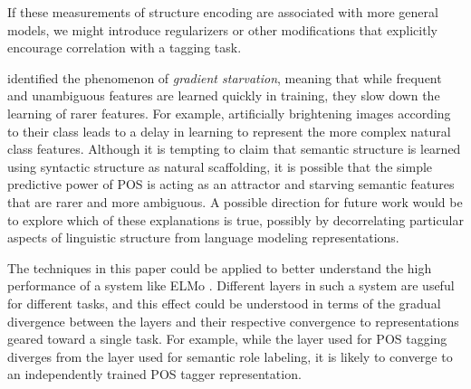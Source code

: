 If these measurements of structure encoding are associated with more general models, we might introduce regularizers or other modifications that explicitly encourage correlation with a tagging task.


\citet{combes_learning_2019} identified the phenomenon of \emph{gradient starvation}, meaning that while frequent and unambiguous features are learned quickly in training, they slow down the learning of rarer features. For example, artificially brightening images according to their class leads to a delay in learning to represent the more complex natural class features. Although it is tempting to claim that semantic structure is learned using  syntactic structure as natural scaffolding, it is possible that the simple predictive power of POS is acting as an attractor and starving semantic features that are rarer and more ambiguous. A possible direction for future work would be to explore which of these explanations is true, possibly by decorrelating particular aspects of linguistic structure from language modeling representations.


The techniques in this paper could be applied to better understand the high performance of a system like ELMo \citep{peters_deep_2018}. Different layers in such a system are useful for different tasks, and this effect could be understood in terms of the gradual divergence between the layers and their respective convergence to representations geared toward a single task. 
For example, while the layer used for POS tagging diverges from the layer used for semantic role labeling, it is likely to converge to an independently trained POS tagger representation.


